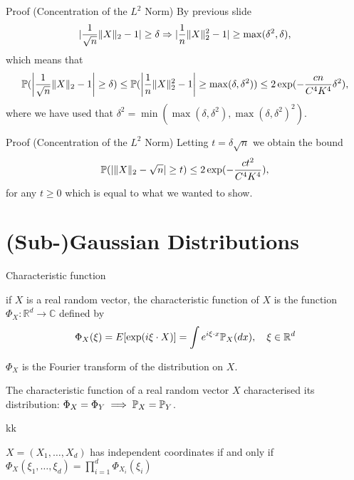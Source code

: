 \documentclass{beamer}
\begin{document}
  \begin{frame}{Proof (Concentration of the \(L^{2}\) Norm)}
    By previous slide
    \begin{equation}
      \abs{\frac{1}{\sqrt{n}}\norm{X}_{2} - 1} \geq \delta \Rightarrow \abs{\frac{1}{n}\norm{X}^{2}_{2} - 1} \geq \max(\delta^{2}, \delta),
    \end{equation}
    \pause which means that
    \begin{equation}
      \Pr(\abs*{\frac{1}{\sqrt{n}}\norm{X}_{2} - 1} \geq \delta) \leq \Pr(\abs*{\frac{1}{n}\norm{X}^{2}_{2} - 1} \geq \max(\delta, \delta^{2})) \leq 2 \exp(-\frac{cn}{C^{4}K^{4}}\delta^{2}),
    \end{equation}
    where we have used that \(\delta^{2} = \min(\max(\delta, \delta^{2}), \max(\delta, \delta^{2})^{2})\).
  \end{frame}

  \begin{frame}{Proof (Concentration of the \(L^{2}\) Norm)}
    Letting \(t = \delta \sqrt{n}\) we obtain the bound
    \begin{equation}
      \Pr(\abs{\norm{X}_{2} - \sqrt{n}} \geq t) \leq 2\exp(-\frac{ct^{2}}{C^{4}K^{4}}),
    \end{equation}
    for any \(t \geq 0\) which is equal to what we wanted to show.
  \end{frame}

  \section{(Sub-)Gaussian Distributions}

  \begin{frame}{Characteristic function}

    \begin{definition}
      if $X$ is a real random vector, the characteristic function of $X$ is the function
      $\Phi_{X}: \mathbb{R}^{d} \longrightarrow \mathbb{C}$ defined by
      $$
      \Phi_{X}(\xi)=E[\exp (i \xi \cdot X)] = \int e^{i \xi \cdot x} \P_{X}(d x), \quad \xi \in \mathbb{R}^{d}
      $$

      $\Phi_{X}$ is the Fourier transform of the distribution on $X$.
    \end{definition}

    \pause

    \begin{theorem}
      The characteristic function of a real random vector $X$ characterised its
      distribution: $\Phi_X = \Phi_Y \implies \P_X = \P_Y$.
    \end{theorem}kk

    \pause

    
    \begin{proposition}
      $X=(X_1,\ldots,X_d)$ has independent coordinates if and only if \\
      $\Phi_{X}\left(\xi_{1}, \ldots, \xi_{d}\right)=\prod_{i=1}^{d}
      \Phi_{X_{i}}\left(\xi_{i}\right)$
    \end{proposition}
  \end{frame}
\end{document}
